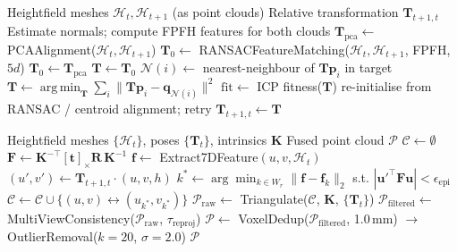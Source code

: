 \documentclass[review]{elsarticle}
\DeclareMathOperator*{\argmin}{arg\,min}
\begin{document}
\begin{algorithm}[h]
\caption{Heightfield-Based Pose Estimation}
\label{alg:pose}
\begin{algorithmic}[1]
\REQUIRE Heightfield meshes $\mathcal{H}_t, \mathcal{H}_{t+1}$ (as point clouds)
\ENSURE Relative transformation $\mathbf{T}_{t+1,t}$
\STATE Estimate normals; compute FPFH features for both clouds
\STATE $\mathbf{T}_{\mathrm{pca}} \leftarrow$ PCAAlignment($\mathcal{H}_t, \mathcal{H}_{t+1}$) 
    \STATE $\mathbf{T}_0 \leftarrow$ RANSACFeatureMatching($\mathcal{H}_t, \mathcal{H}_{t+1}$, FPFH, $5d$) 
\ELSE
    \STATE $\mathbf{T}_0 \leftarrow \mathbf{T}_{\mathrm{pca}}$
\ENDIF
\STATE $\mathbf{T} \leftarrow \mathbf{T}_0$
    \STATE $\mathcal{N}(i) \leftarrow$ nearest-neighbour of $\mathbf{T}\mathbf{p}_i$ in target
    \STATE $\mathbf{T} \leftarrow \argmin_{\mathbf{T}} \sum_i \|\mathbf{T}\mathbf{p}_i - \mathbf{q}_{\mathcal{N}(i)}\|^2$ 
\ENDWHILE
\STATE $\mathrm{fit} \leftarrow$ ICP fitness($\mathbf{T}$)
    \STATE re-initialise from RANSAC / centroid alignment; retry
\ENDIF
\RETURN $\mathbf{T}_{t+1,t} \leftarrow \mathbf{T}$
\end{algorithmic}
\end{algorithm}

\begin{algorithm}[h]
\caption{Dense Epipolar Matching and Metric Fusion}
\label{alg:fusion}
\begin{algorithmic}[1]
\REQUIRE Heightfield meshes $\{\mathcal{H}_t\}$, poses $\{\mathbf{T}_t\}$, intrinsics $\mathbf{K}$
\ENSURE Fused point cloud $\mathcal{P}$
\STATE $\mathcal{C} \leftarrow \emptyset$ 
    \STATE $\mathbf{F} \leftarrow \mathbf{K}^{-\top}[\mathbf{t}]_\times \mathbf{R}\,\mathbf{K}^{-1}$ 
        \STATE $\mathbf{f} \leftarrow$ Extract7DFeature$(u,v,\mathcal{H}_t)$
        \STATE $(u',v') \leftarrow \mathbf{T}_{t+1,t} \cdot (u,v,h)$ 
        \STATE $k^* \leftarrow \arg\min_{k \in W_r} \|\mathbf{f} - \mathbf{f}_k\|_2$ s.t. $|\mathbf{u}'^\top \mathbf{F}\mathbf{u}| < \epsilon_{\mathrm{epi}}$
            \STATE $\mathcal{C} \leftarrow \mathcal{C} \cup \{(u,v) \leftrightarrow (u_{k^*}, v_{k^*})\}$
        \ENDIF
    \ENDFOR
\ENDFOR
\STATE $\mathcal{P}_{\mathrm{raw}} \leftarrow$ Triangulate($\mathcal{C}$, $\mathbf{K}$, $\{\mathbf{T}_t\}$) 
\STATE $\mathcal{P}_{\mathrm{filtered}} \leftarrow$ MultiViewConsistency($\mathcal{P}_{\mathrm{raw}}$, $\tau_{\mathrm{reproj}}$)
\STATE $\mathcal{P} \leftarrow$ VoxelDedup($\mathcal{P}_{\mathrm{filtered}}$, 1.0\,mm) $\to$ OutlierRemoval($k{=}20$, $\sigma{=}2.0$)
\RETURN $\mathcal{P}$
\end{algorithmic}
\end{algorithm}
\end{document}
